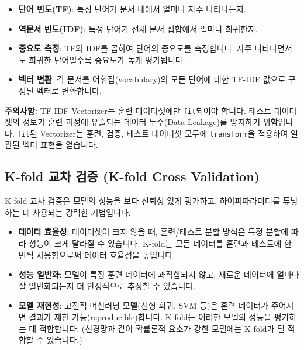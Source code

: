 \documentclass[11pt,a4paper]{article}
\theoremstyle{definition}
\begin{document}
\begin{infobox}[title={TF-IDF Vectorizer의 역할}]
\begin{itemize}
    \item \textbf{단어 빈도(TF)}: 특정 단어가 문서 내에서 얼마나 자주 나타나는지.
    \item \textbf{역문서 빈도(IDF)}: 특정 단어가 전체 문서 집합에서 얼마나 희귀한지.
    \item \textbf{중요도 측정}: TF와 IDF를 곱하여 단어의 중요도를 측정합니다. 자주 나타나면서도 희귀한 단어일수록 중요도가 높게 평가됩니다.
    \item \textbf{벡터 변환}: 각 문서를 어휘집(vocabulary)의 모든 단어에 대한 TF-IDF 값으로 구성된 벡터로 변환합니다.
\end{itemize}
\end{infobox}

\textbf{주의사항:}
TF-IDF Vectorizer는 훈련 데이터셋에만 \texttt{fit}되어야 합니다. 테스트 데이터셋의 정보가 훈련 과정에 유출되는 데이터 누수(Data Leakage)를 방지하기 위함입니다. \texttt{fit}된 Vectorizer는 훈련, 검증, 테스트 데이터셋 모두에 \texttt{transform}을 적용하여 일관된 벡터 표현을 얻습니다.

\subsection{K-fold 교차 검증 (K-fold Cross Validation)}

K-fold 교차 검증은 모델의 성능을 보다 신뢰성 있게 평가하고, 하이퍼파라미터를 튜닝하는 데 사용되는 강력한 기법입니다.

\begin{summarybox}[title={K-fold 교차 검증의 필요성}]
\begin{itemize}
    \item \textbf{데이터 효율성}: 데이터셋이 크지 않을 때, 훈련/테스트 분할 방식은 특정 분할에 따라 성능이 크게 달라질 수 있습니다. K-fold는 모든 데이터를 훈련과 테스트에 한 번씩 사용함으로써 데이터 효율성을 높입니다.
    \item \textbf{성능 일반화}: 모델이 특정 훈련 데이터에 과적합되지 않고, 새로운 데이터에 얼마나 잘 일반화되는지 더 안정적으로 추정할 수 있습니다.
    \item \textbf{모델 재현성}: 고전적 머신러닝 모델(선형 회귀, SVM 등)은 훈련 데이터가 주어지면 결과가 재현 가능(reproducible)합니다. K-fold는 이러한 모델의 성능을 평가하는 데 적합합니다. (신경망과 같이 확률론적 요소가 강한 모델에는 K-fold가 덜 적합할 수 있습니다.)
\end{itemize}
\end{summarybox}
\end{document}
